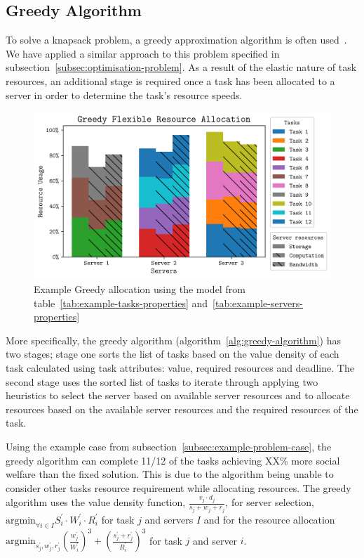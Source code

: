 \subsection{Greedy Algorithm}
\label{subsec:greedy-algorithm}
To solve a knapsack problem, a greedy approximation algorithm is often used~\cite{sahni1975approximate}. We have
applied a similar approach to this problem specified in subsection~\ref{subsec:optimisation-problem}. As a result of
the elastic nature of task resources, an additional stage is required once a task has been allocated to a server in
order to determine the task's resource speeds.

\begin{figure}
    \centering
    \includegraphics[width=\linewidth]{figs/allocation/greedy_flexible_resource_allocation.png}
    \caption{Example Greedy allocation using the model from table~\ref{tab:example-tasks-properties}
    and~\ref{tab:example-servers-properties}}
    \label{fig:example-greedy-allocation}
\end{figure}

More specifically, the greedy algorithm (algorithm~\ref{alg:greedy-algorithm}) has two stages; stage one sorts the list
of tasks based on the value density of each task calculated using task attributes: value, required resources and
deadline. The second stage uses the sorted list of tasks to iterate through applying two heuristics to select the
server based on available server resources and to allocate resources based on the available server resources and the
required resources of the task.

Using the example case from subsection~\ref{subsec:example-problem-case}, the greedy algorithm can complete 11/12 of
the tasks achieving XX\% more social welfare than the fixed solution. This is due to the algorithm being unable to %
consider other tasks resource requirement while allocating resources. The greedy algorithm uses the value density
function, $\frac{v_j \cdot d_j}{s_j + w_j + r_j}$, for server selection,
$\text{argmin}_{\forall i \in I} S^{'}_i \cdot W^{'}_i \cdot R^{'}_i$ for task $j$ and servers $I$ and for the resource allocation
$\text{argmin}_{s^{'}_j, w^{'}_j, r^{'}_j} \left(\frac{w^{'}_j}{W^{'}_i}\right)^3 + \left(\frac{s^{'}_j + r^{'}_j}{R^{'}_i}\right)^3$
for task $j$ and server $i$.

